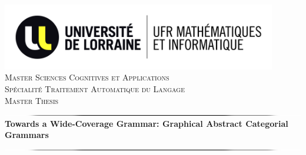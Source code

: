 \documentclass{report}
\begin{document}
\begin{titlepage}
\begin{center}

\newcommand{\HRule}{\includegraphics[width=\textwidth]{images/hrule.png}}

\includegraphics[width=0.9\textwidth]{images/UL_UFR_MI.jpg}\\[2cm]

\textsc{\LARGE Master Sciences Cognitives et Applications\\Sp\'ecialit\'e Traitement Automatique du Langage}\\[1.5cm]

\textsc{\Large Master Thesis}\\[0.65cm]

\HRule \\[0.6cm]
{ \huge \bfseries Towards a Wide-Coverage Grammar: Graphical Abstract Categorial Grammars }\\[0.4cm]

\HRule \\[1.75cm]


\end{center}
\end{titlepage}
\end{document}
